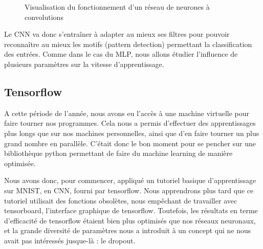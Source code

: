 \documentclass[
    10pt,
    a4paper,
    oneside,
    headinclude,footinclude,
    BCOR=5mm,
    captions=tableabove
]{scrartcl}
\begin{document}
\begin{figure}[h!]
\centering
{}
\caption{Visualisation du fonctionnement d'un réseau de neurones à convolutions}
\label{fig:CNN.png}
\end{figure}


Le CNN va donc s'entraîner à adapter au mieux ses filtres pour pouvoir reconnaître au mieux les motifs (pattern detection) permettant la classification des entrées. Comme dans le cas du MLP, nous allons étudier l'influence de plusieurs paramètres sur la vitesse d'apprentissage. 

\subsection{Tensorflow}

A cette période de l'année, nous avons eu l'accès à une machine virtuelle pour faire tourner nos programmes. Cela nous a permis d'effectuer des apprentissages plus longs que sur nos machines personnelles, ainsi que d'en faire tourner un plus grand nombre en parallèle. C'était donc le bon moment pour se pencher sur une bibliothèque python permettant de faire du machine learning de manière optimisée.

Nous avons donc, pour commencer, appliqué un tutoriel basique d'apprentissage sur MNIST, en CNN, fourni par tensorflow. Nous apprendrons plus tard que ce tutoriel utilisait des fonctions obsolètes, nous empêchant de travailler avec tensorboard, l'interface graphique de tensorflow. Toutefois, les résultats en terme d'efficacité de tensorflow étaient bien plus optimisés que nos réseaux neuronaux, et la grande diversité de paramètres nous a introduit à un concept qui ne nous avait pas intéressés jusque-là : le dropout.
\end{document}
